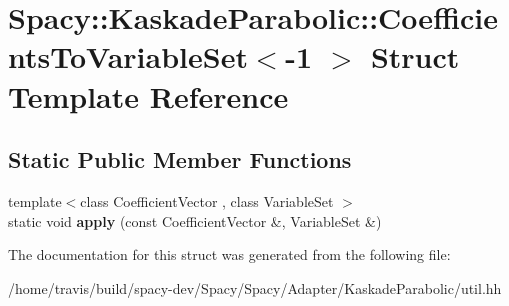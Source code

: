 \hypertarget{structSpacy_1_1KaskadeParabolic_1_1CoefficientsToVariableSet_3-1_01_4}{\section{Spacy\-:\-:Kaskade\-Parabolic\-:\-:Coefficients\-To\-Variable\-Set$<$-\/1 $>$ Struct Template Reference}
\label{structSpacy_1_1KaskadeParabolic_1_1CoefficientsToVariableSet_3-1_01_4}
}
\subsection*{Static Public Member Functions}
\begin{DoxyCompactItemize}
\item 
\hypertarget{structSpacy_1_1KaskadeParabolic_1_1CoefficientsToVariableSet_3-1_01_4_a9a49afe2a864e75f4d5a9779d8346e44}{{\footnotesize template$<$class Coefficient\-Vector , class Variable\-Set $>$ }\\static void {\bfseries apply} (const Coefficient\-Vector \&, Variable\-Set \&)}\label{structSpacy_1_1KaskadeParabolic_1_1CoefficientsToVariableSet_3-1_01_4_a9a49afe2a864e75f4d5a9779d8346e44}

\end{DoxyCompactItemize}


The documentation for this struct was generated from the following file\-:\begin{DoxyCompactItemize}
\item 
/home/travis/build/spacy-\/dev/\-Spacy/\-Spacy/\-Adapter/\-Kaskade\-Parabolic/util.\-hh\end{DoxyCompactItemize}
